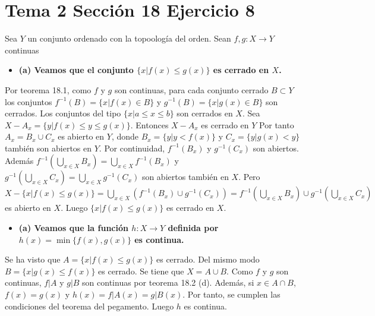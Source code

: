 \documentclass{article}
\begin{document}
\section{Tema 2 Sección 18 Ejercicio 8}
Sea $Y$ un conjunto ordenado con la topoología del orden. Sean $f,g: X\rightarrow Y$ continuas
\begin{itemize}
\item \bf (a) \rm Veamos que el conjunto $\{x|f(x)\leq g(x)\}$ es cerrado en $X$.
\end{itemize}
Por teorema 18.1, como $f$ y $g$ son continuas, para cada conjunto cerrado $B\subset Y$ los conjuntos $f^{-1}(B)=\{x|f(x)\in B\}$ y $g^{-1}(B)=\{x|g(x)\in B\}$ son cerrados. Los conjuntos del tipo $\{x|a\leq x \leq b\}$ son cerrados en $X$. Sea $X-A_x=\{y|f(x)\leq y\leq g(x)\}$. Entonces $X-A_x$ es cerrado en $Y$ Por tanto $A_x=B_x\cup C_x$ es abierto en $Y$, donde $B_x=\{y|y<f(x)\}$ y $C_x=\{y|g(x)<y\}$ también son abiertos en $Y$. Por continuidad, $f^{-1}(B_x)$ y $g^{-1}(C_x)$ son abiertos. Además $f^{-1}\left(\bigcup_{x\in X}B_x\right)=\bigcup_{x\in X}f^{-1}(B_x)$  y $g^{-1}\left(\bigcup_{x\in X}C_x\right)=\bigcup_{x\in X}g^{-1}(C_x)$ son abiertos también en $X$. Pero $X-\{x|f(x)\leq g(x)\}=\bigcup_{x\in X}\left(f^{-1}(B_x)\cup g^{-1}(C_x)\right)=f^{-1}\left(\bigcup_{x\in X}B_x\right)\cup g^{-1}\left(\bigcup_{x\in X}C_x\right)$ es abierto en $X$. Luego $\{x|f(x)\leq g(x)\}$ es cerrado en $X$.
\begin{itemize}
\item \bf (a) \rm Veamos que la función $h:X\rightarrow Y$ definida por $h(x)=\min\{f(x),g(x)\}$ es continua.
\end{itemize}
Se ha visto que $A=\{x|f(x)\leq g(x)\}$ es cerrado. Del mismo modo $B=\{x|g(x)\leq f(x)\}$ es cerrado. Se tiene que $X=A\cup B$. Como $f$ y $g $ son continuas, $f|A$ y $g|B$ son continuas por teorema 18.2 (d). Además, si $x\in A\cap B$, $f(x)=g(x)$ y $h(x)=f|A(x)=g|B(x)$. Por tanto, se cumplen las condiciones del teorema del pegamento. Luego $h$ es continua.
\end{document}

